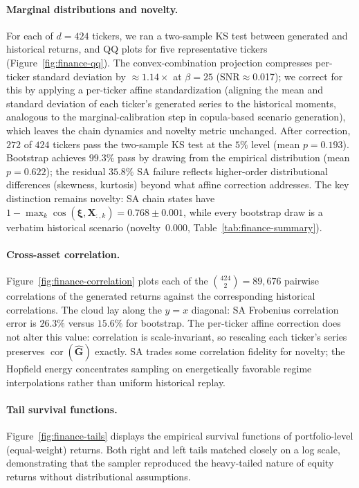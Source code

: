 \paragraph{Marginal distributions and novelty.}
For each of $d=424$ tickers, we ran a two-sample KS test between generated and historical returns, and QQ plots for five representative tickers (Figure~\ref{fig:finance-qq}). The convex-combination projection compresses per-ticker standard deviation by $\approx1.14\times$ at $\beta{=}25$ (SNR$\approx$0.017); we correct for this by applying a per-ticker affine standardization (aligning the mean and standard deviation of each ticker's generated series to the historical moments, analogous to the marginal-calibration step in copula-based scenario generation), which leaves the chain dynamics and novelty metric unchanged. After correction, $272$ of $424$ tickers pass the two-sample KS test at the $5\%$ level (mean $p{=}0.193$). Bootstrap achieves $99.3\%$ pass by drawing from the empirical distribution (mean $p{=}0.622$); the residual $35.8\%$ SA failure reflects higher-order distributional differences (skewness, kurtosis) beyond what affine correction addresses. The key distinction remains novelty: SA chain states have $1-\max_k\cos(\boldsymbol{\xi},\mathbf{X}_{:,k})=0.768\pm0.001$, while every bootstrap draw is a verbatim historical scenario (novelty~$0.000$, Table~\ref{tab:finance-summary}).

\paragraph{Cross-asset correlation.}
Figure~\ref{fig:finance-correlation} plots each of the $\binom{424}{2}=89{,}676$ pairwise correlations of the generated returns against the corresponding historical correlations. The cloud lay along the $y=x$ diagonal: SA Frobenius correlation error is $26.3\%$ versus $15.6\%$ for bootstrap. The per-ticker affine correction does not alter this value: correlation is scale-invariant, so rescaling each ticker's series preserves $\operatorname{cor}(\hat{\mathbf{G}})$ exactly. SA trades some correlation fidelity for novelty; the Hopfield energy concentrates sampling on energetically favorable regime interpolations rather than uniform historical replay.

\paragraph{Tail survival functions.}
Figure~\ref{fig:finance-tails} displays the empirical survival functions of portfolio-level (equal-weight) returns. Both right and left tails matched closely on a log scale, demonstrating that the sampler reproduced the heavy-tailed nature of equity returns without distributional assumptions.

